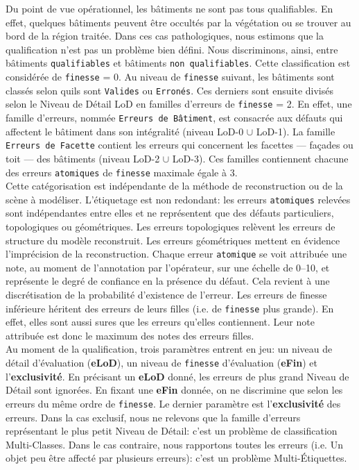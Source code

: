         Du point de vue opérationnel, les bâtiments ne sont pas tous qualifiables.
        En effet, quelques bâtiments peuvent être occultés par la végétation ou se trouver au bord de la région traitée.
        Dans ces cas pathologiques, nous estimons que la qualification n'est pas un problème bien défini.
        Nous discriminons, ainsi, entre bâtiments \texttt{qualifiables} et bâtiments \texttt{non qualifiables}.
        Cette classification est considérée de \texttt{finesse} = 0.
        Au niveau de \texttt{finesse} suivant, les bâtiments sont classés selon quils sont \texttt{Valides} ou \texttt{Erronés}.
        Ces derniers sont ensuite divisés selon le Niveau de Détail LoD en familles d'erreurs de \texttt{finesse} = 2.
        En effet, une famille d'erreurs, nommée \texttt{Erreurs de Bâtiment}, est consacrée aux défauts qui affectent le bâtiment dans son intégralité (niveau LoD-0 \(\cup\) LoD-1).
        La famille \texttt{Erreurs de Facette} contient les erreurs qui concernent les facettes --- façades ou toit --- des bâtiments (niveau LoD-2 \(\cup\) LoD-3).
        Ces familles contiennent chacune des erreurs \texttt{atomiques} de \texttt{finesse} maximale égale à $3$.\\

        Cette catégorisation est indépendante de la méthode de reconstruction ou de la scène à modéliser.
        L'étiquetage est non redondant: les erreurs \texttt{atomiques} relevées sont indépendantes entre elles et ne représentent que des défauts particuliers, topologiques ou géométriques.
        Les erreurs topologiques relèvent les erreurs de structure du modèle reconstruit.
        Les erreurs géométriques mettent en évidence l'imprécision de la reconstruction.
        Chaque erreur \texttt{atomique} se voit attribuée une note, au moment de l'annotation par l'opérateur, sur une échelle de \numrange{0}{10}, et représente le degré de confiance en la présence du défaut.
        Cela revient à une discrétisation de la probabilité d'existence de l'erreur.
        Les erreurs de finesse inférieure héritent des erreurs de leurs filles (i.e. de \texttt{finesse} plus grande).
        En effet, elles sont aussi sures que les erreurs qu'elles contiennent.
        Leur note attribuée est donc le maximum des notes des erreurs filles.\\

        Au moment de la qualification, trois paramètres entrent en jeu: un niveau de détail d'évaluation (\textbf{eLoD}), un niveau de \texttt{finesse} d'évaluation (\textbf{eFin}) et l'\textbf{exclusivité}.
        En précisant un \textbf{eLoD} donné, les erreurs de plus grand Niveau de Détail sont ignorées.
        En fixant une \textbf{eFin} donnée, on ne discrimine que selon les erreurs du même ordre de \texttt{finesse}.
        Le dernier paramètre est l'\textbf{exclusivité} des erreurs.
        Dans la cas exclusif, nous ne relevons que la famille d'erreurs représentant le plus petit Niveau de Détail: c'est un problème de classification Multi-Classes.
        Dans le cas contraire, nous rapportons toutes les erreurs (i.e. Un objet peu être affecté par plusieurs erreurs): c'est un problème Multi-\'Etiquettes.\\

